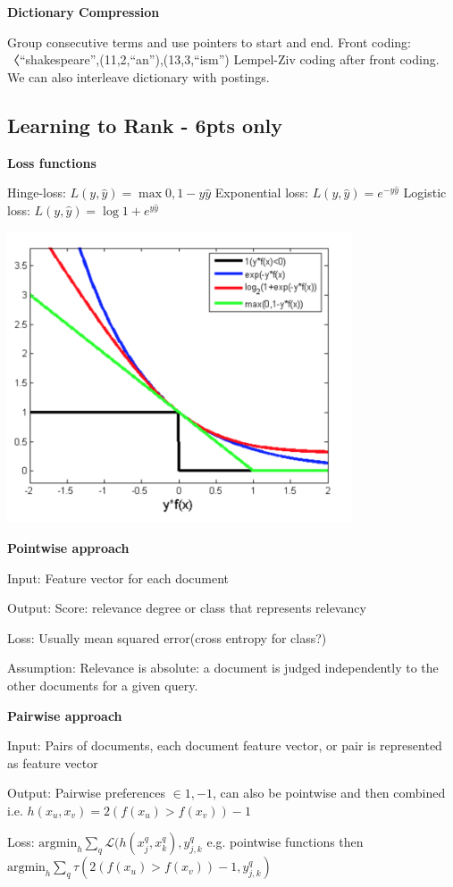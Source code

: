\documentclass[a4paper,10pt,landscape]{article}
\newcommand{\topic}[1]{\begin{center}\section*{#1}\end{center}}
\begin{document}
\begin{multicols}{3}
\textbf{Dictionary Compression}

Group consecutive terms and use pointers to start and end. Front coding:
〈“shakespeare”,(11,2,“an”),(13,3,“ism”)
Lempel-Ziv coding after front coding. We can also interleave dictionary with postings.

\topic{Learning to Rank - 6pts only}

\textbf{Loss functions}

Hinge-loss: $L(y,\hat{y}) = \max{0,1-y\hat{y}}$
Exponential loss: $L(y,\hat{y}) = e^{-y\hat{y}}$
Logistic loss: $L(y,\hat{y}) = \log{1+e^{y\hat{y}}}$

\includegraphics[width=.75\linewidth]{images/rankloss.png}

\textbf{Pointwise approach}

Input: Feature vector for each document

Output: Score: relevance degree or class that represents relevancy

Loss: Usually mean squared error(cross entropy for class?)

Assumption: Relevance is absolute: a document is judged independently to the other documents for a given query.

\textbf{Pairwise approach}

Input: Pairs of documents, each document feature vector, or pair is represented as feature vector

Output: Pairwise preferences $\in {1,-1}$, can also be pointwise and then combined i.e. $h(x_u,x_v) = 2(f(x_u)>f(x_v))-1$

Loss: $\text{argmin}_h\sum_q\mathcal{L}(h(x_j^q,x_k^q),y_{j,k}^q$
e.g. pointwise functions then $\text{argmin}_h\sum_q\tau(2(f(x_u)>f(x_v))-1,y_{j,k}^q)$


\end{multicols}
\end{document}
